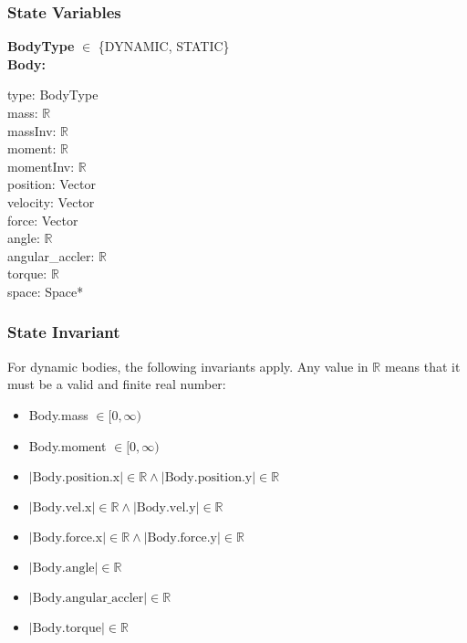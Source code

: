 \documentclass[12pt]{article}
\newcommand{\R}{$\mathbb{R}$}
\begin{document}
\subsubsection{State Variables} \label{SecSVBody}
	\textbf{BodyType} $\in$ \{DYNAMIC, STATIC\} \\ 
	\newline
	\textbf{Body:} 
	 \begin{multicols}{3}
		\noindent type: BodyType \\
		mass: \R \\
		massInv: \R \\
		moment: \R \\
		momentInv: \R \\
		position: Vector \\
		velocity: Vector \\
		force: Vector \\
		angle: \R \\
		angular_accler: \R \\
		torque: \R \\
		space: Space* \\
	\end{multicols}
	
\subsubsection{State Invariant} \label{SecSIBody}
	For dynamic bodies, the following invariants apply. Any value in $\mathbb{R}$ means that it must be a valid and finite real number: 
	\begin{itemize}
	\item Body.mass $\in [0, \infty)$ 
	\item Body.moment $\in [0, \infty)$ 
	\item $|\text{Body.position.x}| \in \mathbb{R} \wedge |\text{Body.position.y}| \in \mathbb{R}$ 
	\item $|\text{Body.vel.x}| \in \mathbb{R} \wedge |\text{Body.vel.y}| \in \mathbb{R}$ 	
	\item $|\text{Body.force.x}| \in \mathbb{R} \wedge |\text{Body.force.y}| \in \mathbb{R}$ 
	\item $|\text{Body.angle}| \in \mathbb{R}$  
	\item $|\text{Body.angular_accler}| \in \mathbb{R}$  
	\item $|\text{Body.torque}| \in \mathbb{R}$
	\end{itemize}
\end{document}
